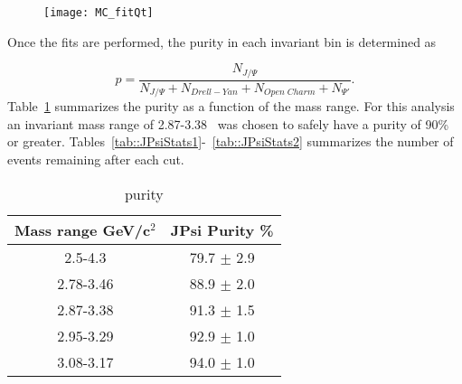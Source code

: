 \begin{figure}[h!t]
  \centering
  \texttt{[image: MC\_fitQt]}
  \caption{}
  \label{fig::MC_fitQt}
\end{figure}

Once the fits are performed, the {\jp} purity in each invariant bin is
determined as

\begin{equation}
  p = \frac{N_{J/\Psi}}{N_{J/\Psi} + N_{Drell-Yan} + N_{Open\;Charm} +
    N_{\Psi'}}.
\end{equation}
\noindent
Table~\ref{tab::JPsiPurity} summarizes the {\jp} purity as a function of the
mass range.  For this analysis an invariant mass range of 2.87-3.38~{\gvcw} was
chosen to safely have a {\jp} purity of 90\% or greater.
Tables~\ref{tab::JPsiStats1}-~\ref{tab::JPsiStats2} summarizes the number of
events remaining after each cut.

\begin{table}
  \centering
  \begin{tabular}{ |c|c| }
    \hline
    \textbf{Mass range GeV/c$^2$}& \textbf{JPsi Purity \%}
    \\ \hline \hline
    2.5-4.3& 79.7 $\pm$ 2.9 \\ \hline
    2.78-3.46& 88.9 $\pm$ 2.0 \\ \hline
    2.87-3.38& 91.3 $\pm$ 1.5 \\ \hline
    2.95-3.29& 92.9 $\pm$ 1.0 \\ \hline
    3.08-3.17& 94.0 $\pm$ 1.0 \\ \hline
    
  \end{tabular}
  \caption{{\jp} purity}
  \label{tab::JPsiPurity}
\end{table}

